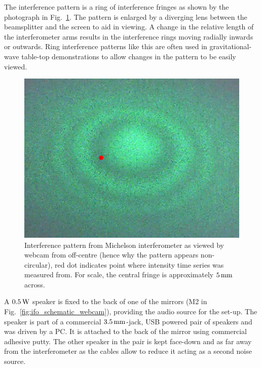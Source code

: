 \documentclass[paper-main.tex]{subfiles}
\begin{document}
The interference pattern is a ring of interference fringes as shown by the photograph in Fig.~\ref{fig:interference_pattern}. 
The pattern is enlarged by a diverging lens between the beamsplitter and the screen to aid in viewing. 
A change in the relative length of the interferometer arms results in the interference rings moving radially inwards or outwards. 
Ring interference patterns like this are often used in gravitational-wave table-top demonstrations to allow changes in the pattern to be easily viewed. 


\begin{figure}
 \begin{center}
  \includegraphics[width=.45\textwidth]{figures/webcam_still0_crop.pdf}
 \end{center}
 \caption{\label{fig:interference_pattern}
 Interference pattern from Michelson interferometer as viewed by webcam from off-centre (hence why the pattern appears non-circular), red dot indicates point where intensity time series was measured from. For scale, the central fringe is approximately $5\,{\rm mm}$ across.}
\end{figure}


A $0.5\,{\rm W}$ speaker is fixed to the back of one of the mirrors (M2 in Fig.~\ref{fig:ifo_schematic_webcam}), providing the audio source for the set-up. 
The speaker is part of a commercial $3.5\,{\rm mm}$-jack, USB powered pair of speakers and was driven by a PC. 
It is attached to the back of the mirror using commercial adhesive putty. 
The other speaker in the pair is kept face-down and as far away from the interferometer as the cables allow to reduce it acting as a second noise source. 
\end{document}
